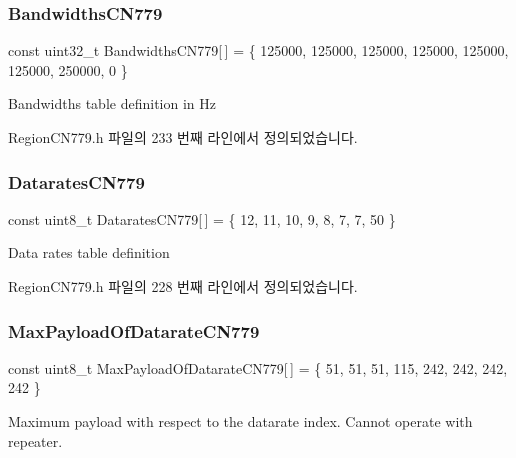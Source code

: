 \subsubsection{\texorpdfstring{Bandwidths\+C\+N779}{BandwidthsCN779}}
{\footnotesize\ttfamily const uint32\+\_\+t Bandwidths\+C\+N779\mbox{[}$\,$\mbox{]} = \{ 125000, 125000, 125000, 125000, 125000, 125000, 250000, 0 \}\hspace{0.3cm}{\ttfamily [static]}}

Bandwidths table definition in Hz 

Region\+C\+N779.\+h 파일의 233 번째 라인에서 정의되었습니다.

\mbox{\label{group___r_e_g_i_o_n_c_n779_ga3afe3fa6719843ac5da4a1e8e758dc8b}} 
\subsubsection{\texorpdfstring{Datarates\+C\+N779}{DataratesCN779}}
{\footnotesize\ttfamily const uint8\+\_\+t Datarates\+C\+N779\mbox{[}$\,$\mbox{]} = \{ 12, 11, 10, 9, 8, 7, 7, 50 \}\hspace{0.3cm}{\ttfamily [static]}}

Data rates table definition 

Region\+C\+N779.\+h 파일의 228 번째 라인에서 정의되었습니다.

\mbox{\label{group___r_e_g_i_o_n_c_n779_ga3fd6e224742f7f2aa66b659d25b71e53}} 
\subsubsection{\texorpdfstring{Max\+Payload\+Of\+Datarate\+C\+N779}{MaxPayloadOfDatarateCN779}}
{\footnotesize\ttfamily const uint8\+\_\+t Max\+Payload\+Of\+Datarate\+C\+N779\mbox{[}$\,$\mbox{]} = \{ 51, 51, 51, 115, 242, 242, 242, 242 \}\hspace{0.3cm}{\ttfamily [static]}}

Maximum payload with respect to the datarate index. Cannot operate with repeater. 

